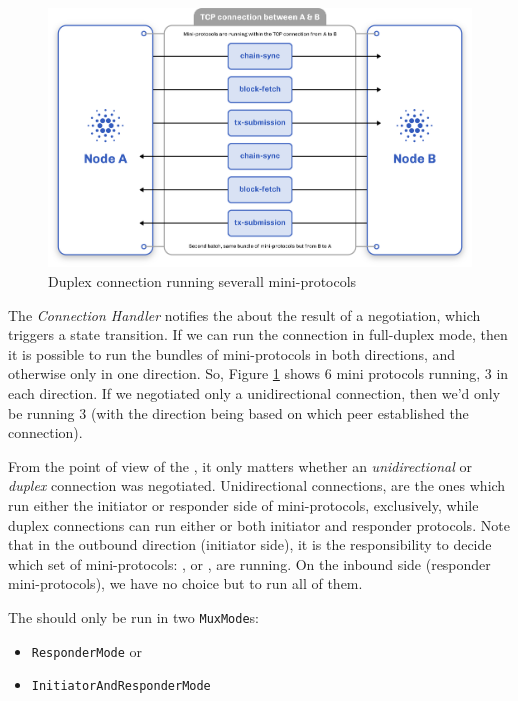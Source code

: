 \begin{figure}
    \centering
    \includegraphics[width=\linewidth]{figure/node-to-node-ipc.png}
    \caption{Duplex connection running severall mini-protocols}
    \label{fig:protocol-diagram}
\end{figure}

The \emph{Connection Handler} notifies the \Connmngr{} about the result of a negotiation, which
triggers a state transition. If we can run the connection in full-duplex mode,
then it is possible to run the bundles of mini-protocols in both directions, and otherwise only in one direction.
So, Figure \ref{fig:protocol-diagram} shows $6$ mini protocols running, $3$ in each direction.
If we negotiated only a unidirectional connection, then we'd only be running $3$
(with the direction being based on which peer established the connection).

From the point of view of the \connmngr{}, it only
matters whether an \emph{unidirectional} or \emph{duplex} connection was negotiated.
Unidirectional connections, are the ones which run either the initiator or responder
side of mini-protocols, exclusively, while duplex connections can run either or
both initiator and responder protocols. Note that in the outbound direction (initiator side),
it is the \ptopgov{} responsibility to decide which set of mini-protocols:
\established{}, \warm{} or \hot{}, are running. On the inbound side (responder
mini-protocols), we have no choice but to run all of them.

The \connmngr{} should only be run in two \texttt{MuxMode}s:

\begin{itemize}
  \item \texttt{ResponderMode} or
  \item \texttt{InitiatorAndResponderMode}
\end{itemize}


